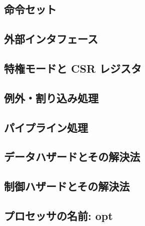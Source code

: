 \documentclass[../main.tex]{subfiles}
\begin{document}
  \subsection{命令セット}
  

  \subsection{外部インタフェース}
  

  \subsection{特権モードと CSR レジスタ}
  

  \subsection{例外・割り込み処理}
  

  \subsection{パイプライン処理}
  

  \subsection{データハザードとその解決法}
  

  \subsection{制御ハザードとその解決法}
  

  \subsection{プロセッサの名前: opt}
  
\end{document}
